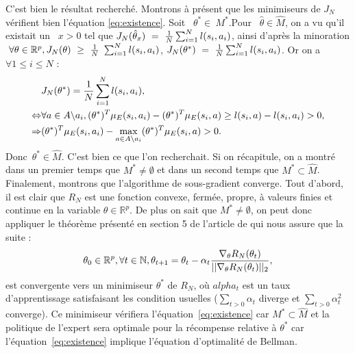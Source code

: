 \documentclass[publibook-draft]{CAp2012}
\begin{document}
C'est bien le résultat recherché. Montrons à présent que les minimiseurs de $J_N$ vérifient bien l'équation \eqref{eq:existence}.
Soit ~$\theta^*\in\ M^*$.Pour ~$\hat{\theta}\in \hat{M}$, on a vu qu'il existait un ~$x>0$ tel que $J_N(\hat{\theta}_x)~=~{1\over N} \sum_{i=1}^N l(s_i,a_i)$, ainsi d'après la minoration $~\forall \theta\in\mathbb{R}^p, J_N(\theta)~\geq~{1\over N}~\sum_{i=1}^Nl(s_i,a_i)$, $J_N(\theta^*)~=~{1\over N} \sum_{i=1}^N l(s_i,a_i)$. Or on a $\forall 1\leq i \leq N$ :
\begin{align}
&J_N(\theta^*)={1\over N} \sum_{i=1}^N l(s_i,a_i),\\
\Leftrightarrow&\forall a \in A \backslash a_i,  (\theta^*)^T\mu_E(s_i,a_i)-(\theta^*)^T\mu_E(s_i,a)\geq l(s_i,a)- l(s_i,a_i)>0,\\
\Rightarrow&(\theta^*)^T\mu_E(s_i,a_i)-\max_{a \in A \backslash a_i}(\theta^*)^T\mu_E(s_i,a)>0.
\end{align}
Donc~$\theta^*\in\hat{M}$. C'est bien ce que l'on recherchait. Si on récapitule, on a montré dans un premier temps que $M^*\neq\emptyset$ et dans un second temps que $M^*\subset\hat{M}$.
Finalement, montrons que l'algorithme de sous-gradient converge. Tout d'abord, il est clair que $R_N$ est une fonction convexe, fermée, propre, à valeurs finies et continue en la variable $\theta\in\mathbb{R}^p$. De plus on sait que $M^*\neq\emptyset$, on peut donc appliquer le théorème présenté en section 5 de l'article de \cite{correa1993convergence} qui nous assure que la suite :
\begin{equation}
\theta_0\in\mathbb{R}^p, \forall t\in\mathbb{N}, \theta_{t+1}=\theta_t -\alpha_t{\nabla_\theta R_N(\theta_t) \over ||\nabla_\theta R_N(\theta_t)||_2},
\end{equation}
est convergente vers un minimiseur $\theta^*$ de $R_N$, où $alpha_t$ est un taux d'apprentissage satisfaisant les condition usuelles ($\sum_{t>0} \alpha_t$ diverge et $\sum_{t>0}\alpha_t^2$ converge). Ce minimiseur vérifiera l'équation~\eqref{eq:existence} car $M^*\subset\hat{M}$ et la politique de l'expert sera optimale pour la récompense relative à $\theta^*$ car l'équation~\eqref{eq:existence} implique l'équation d'optimalité de Bellman.
\end{document}
